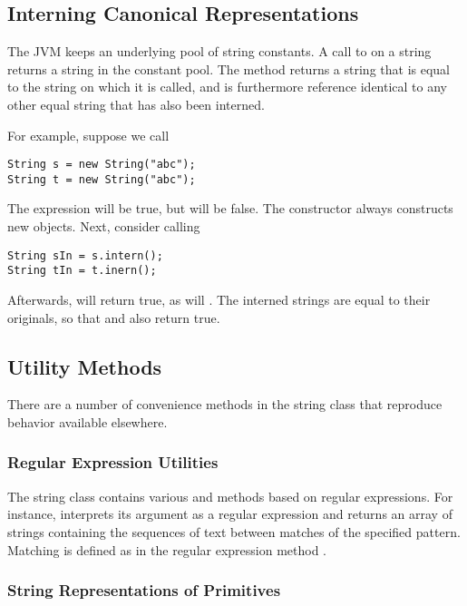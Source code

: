 \subsection{Interning Canonical Representations}\label{section:string-intern}

The JVM keeps an underlying pool of string constants.  A call to
 on a string returns a string in the constant pool.
The method  returns a string that is equal to the
string on which it is called, and is furthermore reference identical
to any other equal string that has also been interned.

For example,  suppose we call
%
\begin{verbatim}
String s = new String("abc");   
String t = new String("abc");   
\end{verbatim}
%
The expression  will be true, but
 will be false.  The constructor  always
constructs new objects.  Next, consider calling
%
\begin{verbatim}
String sIn = s.intern();  
String tIn = t.inern();
\end{verbatim}
%
Afterwards,  will return true, as will
.  The interned strings are equal to their
originals, so that  and  also
return true.


\subsection{Utility Methods}

There are a number of convenience methods in the string class that
reproduce behavior available elsewhere.  

\subsubsection{Regular Expression Utilities}

The string class contains various  and
\code{()} methods based on regular expressions.
For instance,  interprets its argument as a
regular expression and returns an array of strings containing the
sequences of text between matches of the specified pattern.
Matching is defined as in the regular expression method
.

\subsubsection{String Representations of Primitives}

